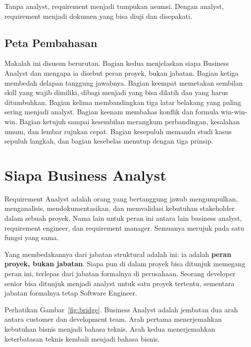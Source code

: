 \documentclass[11pt,a4paper]{article}
\begin{document}
Tanpa analyst, requirement menjadi tumpukan asumsi. Dengan analyst, requirement menjadi dokumen yang bisa diuji dan disepakati.

\subsection{Peta Pembahasan}

Makalah ini disusun berurutan. Bagian kedua menjelaskan siapa Business Analyst dan mengapa ia disebut peran proyek, bukan jabatan. Bagian ketiga membedah delapan tanggung jawabnya. Bagian keempat memetakan sembilan skill yang wajib dimiliki, dibagi menjadi yang bisa dilatih dan yang harus ditumbuhkan. Bagian kelima membandingkan tiga latar belakang yang paling sering menjadi analyst. Bagian keenam membahas konflik dan formula win-win-win. Bagian ketujuh sampai kesembilan merangkum perbandingan, kesalahan umum, dan lembar rujukan cepat. Bagian kesepuluh memandu studi kasus sepuluh langkah, dan bagian kesebelas menutup dengan tiga prinsip.

\section{Siapa Business Analyst}

Requirement Analyst adalah orang yang bertanggung jawab mengumpulkan, menganalisis, mendokumentasikan, dan memvalidasi kebutuhan stakeholder dalam sebuah proyek. Nama lain untuk peran ini antara lain business analyst, requirement engineer, dan requirement manager. Semuanya merujuk pada satu fungsi yang sama.

Yang membedakannya dari jabatan struktural adalah ini: ia adalah \textbf{peran proyek, bukan jabatan}. Siapa pun di dalam proyek bisa ditunjuk memegang peran ini, terlepas dari jabatan formalnya di perusahaan. Seorang developer senior bisa ditunjuk menjadi analyst untuk satu proyek tertentu, sementara jabatan formalnya tetap Software Engineer.

Perhatikan Gambar~\ref{fig:bridge}. Business Analyst adalah jembatan dua arah antara customer dan development team. Arah pertama menerjemahkan kebutuhan bisnis menjadi bahasa teknis. Arah kedua menerjemahkan keterbatasan teknis kembali menjadi bahasa bisnis.
\end{document}
